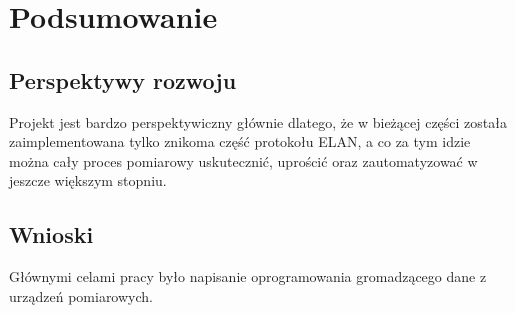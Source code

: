 \section{Podsumowanie}

\subsection{Perspektywy rozwoju}
Projekt jest bardzo perspektywiczny głównie dlatego, że w bieżącej części została zaimplementowana tylko znikoma część protokołu ELAN, a co za tym idzie można cały proces pomiarowy uskutecznić, uprościć oraz zautomatyzować w jeszcze większym stopniu.

\subsection{Wnioski}
Głównymi celami pracy było napisanie oprogramowania gromadzącego dane z urządzeń pomiarowych.